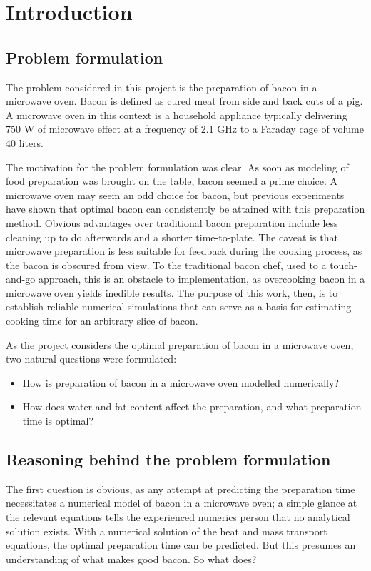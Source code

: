 \chapter{Introduction}
\setcounter{secnumdepth}{1}

\section{Problem formulation}
The problem considered in this project is the preparation of bacon in a microwave oven. Bacon is
defined as cured meat from side and back cuts of a pig. A microwave oven in this context is a
household appliance typically delivering 750 W of microwave effect at a frequency of 2.1 GHz
to a Faraday cage of volume 40 liters. 

The motivation for the problem formulation was clear. As soon as modeling of food preparation was
brought on the table, bacon seemed a prime choice. A microwave oven may seem an odd choice for
bacon, but previous experiments have shown that optimal bacon can consistently be attained with this
preparation method. Obvious advantages over traditional bacon preparation include less cleaning up
to do afterwards and a shorter time-to-plate. The caveat is that microwave preparation is less
suitable for feedback during the cooking process, as the bacon is obscured from view. To the
traditional bacon chef, used to a touch-and-go approach, this is an obstacle to implementation, as
overcooking bacon in a microwave oven yields inedible results. The
purpose of this work, then, is to establish reliable numerical simulations that can serve as a basis
for estimating cooking time for an arbitrary slice of bacon.

As the project considers the optimal preparation of bacon in a microwave oven, two natural questions
were formulated:

\begin{itemize}
  \item How is preparation of bacon in a microwave oven modelled numerically?
  \item How does water and fat content affect the preparation, and what preparation time is optimal?
\end{itemize}

\section{Reasoning behind the problem formulation}
The first question is obvious, as any attempt at predicting the preparation time necessitates a
numerical model of bacon in a microwave oven; a simple glance at the relevant
equations tells the experienced numerics person that no analytical solution
exists. With a numerical solution of the heat and mass transport equations, the
optimal preparation time can be predicted. But this presumes an understanding of
what makes good bacon. So what does?

